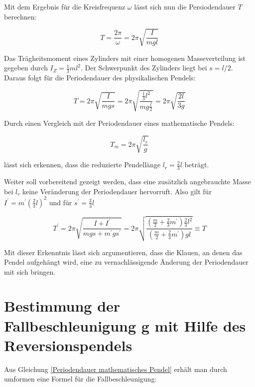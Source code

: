 Mit dem Ergebnis für die Kreisfrequenz $\omega$ lässt sich nun die Persiodendauer $T$ berechnen:

\begin{equation}
    T = \frac{2\pi}{\omega} = 2 \pi \sqrt{\frac{I}{mgl}}
\end{equation}

Das Trägheitsmoment eines Zylinders mit einer homogenen Masseverteilung ist gegeben durch $I_Z = \frac{1}{3} ml^2$. Der Schwerpunkt des Zylinders liegt bei $s = l/2$. Daraus folgt für die Periodendauer des physikalischen Pendels:

\begin{equation}
    T = 2 \pi \sqrt{\frac{I}{mgs}} = 2 \pi \sqrt{\frac{\frac{1}{3} l^2}{mg\frac{l}{2}}} = 2 \pi \sqrt{\frac{2l}{3g}}
\end{equation}

Durch einen Vergleich mit der Periodendauer eines mathematische Pendels:

\begin{equation} \label{Periodendauer mathematisches Pendel}
   T_m = 2 \pi \sqrt{\frac{l_r}{g}} 
\end{equation} 

lässt sich erkennen, dass die reduzierte Pendellänge $l_r = \frac{2}{3}l$ beträgt.

Weiter soll vorbereitend gezeigt werden, dass eine zusätzlich angebrauchte Masse bei $l_r$  keine Veränderung der Periodendauer hervorruft. Also gilt für $I^\prime = m^\prime (\frac{2}{3}l)^2$ und für $s^\prime = \frac{2}{3}l$

\begin{equation}
    T^\prime = 2 \pi \sqrt{\frac{I + I^\prime}{mgs+m^\prime g s^\prime }} = 2\pi \sqrt{ \frac{ (\frac{m}{2} + \frac{2}{3} m^\prime) \frac{2}{3}l^2} { (\frac{m}{2} + \frac{2}{3}m^\prime)g l  }} \equiv T
\end{equation}

Mit dieser Erkenntnis lässt sich argumentieren, dass die Klauen, an denen das Pendel aufgehängt wird, eine zu vernachlässigende Änderung der Periodendauer mit sich bringen.

\section{Bestimmung der Fallbeschleunigung g mit Hilfe des Reversionspendels}

Aus Gleichung \ref{Periodendauer mathematisches Pendel} erhält man durch umformen eine Formel für die Fallbeschleunigung: 

